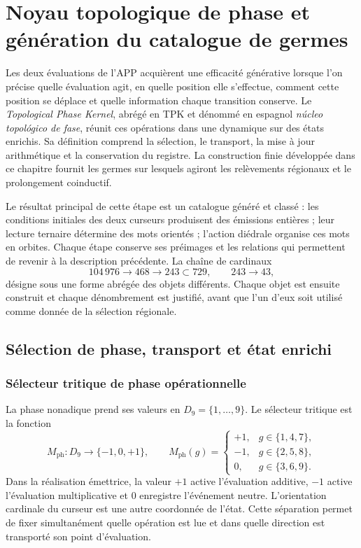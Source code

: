 \section{Noyau topologique de phase et génération du catalogue de germes}
\label{tpk:capitulo}

Les deux évaluations de l'APP acquièrent une efficacité générative lorsque l'on précise
quelle évaluation agit, en quelle position elle s'effectue, comment cette position se déplace
et quelle information chaque transition conserve. Le \emph{Topological Phase Kernel},
abrégé en TPK et dénommé en espagnol \emph{núcleo topológico de fase}, réunit
ces opérations dans une dynamique sur des états enrichis. Sa définition
comprend la sélection, le transport, la mise à jour arithmétique et la conservation du
registre. La construction finie développée dans ce chapitre fournit
les germes sur lesquels agiront les relèvements régionaux et le prolongement
coinductif.

Le résultat principal de cette étape est un catalogue généré et classé :
les conditions initiales des deux curseurs produisent des émissions entières ;
leur lecture ternaire détermine des mots orientés ; l'action diédrale organise
ces mots en orbites. Chaque étape conserve ses préimages et les relations
qui permettent de revenir à la description précédente. La chaîne de cardinaux
\[
 104\,976\longrightarrow468\longrightarrow243\subset729,
 \qquad 243\longrightarrow43,
\]
désigne sous une forme abrégée des objets différents. Chaque objet est ensuite construit et chaque dénombrement
est justifié, avant que l'un d'eux soit utilisé comme donnée de
la sélection régionale.

\subsection{Sélection de phase, transport et état enrichi}
\label{tpk:operaciones}

\subsubsection{Sélecteur tritique de phase opérationnelle}

La phase nonadique prend ses valeurs en \(D_9=\{1,\ldots,9\}\). Le sélecteur  
tritique est la fonction
\begin{equation}
 M_{\mathrm{ph}}:D_9\longrightarrow\{-1,0,+1\},\qquad
 M_{\mathrm{ph}}(g)=
 \begin{cases}
 +1,&g\in\{1,4,7\},\\
 -1,&g\in\{2,5,8\},\\
 0,&g\in\{3,6,9\}.
 \end{cases}
 \label{tpk:selector}
\end{equation}
Dans la réalisation émettrice, la valeur \(+1\) active l'évaluation additive,
\(-1\) active l'évaluation multiplicative et \(0\) enregistre l'événement
neutre. L'orientation cardinale du curseur est une autre coordonnée de l'état.
Cette séparation permet de fixer simultanément quelle opération est lue et dans quelle
direction est transporté son point d'évaluation.

